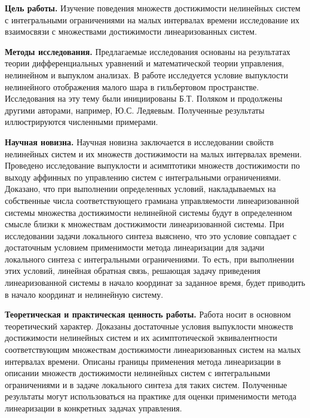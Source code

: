 \documentclass[../main.tex]{subfiles}
\begin{document}
\textbf{Цель работы.} Изучение поведения множеств достижимости нелинейных систем с интегральными ограничениями на малых интервалах времени исследование их взаимосвязи с множествами достижимости линеаризованных систем.
	
\textbf{Методы исследования.} Предлагаемые исследования основаны на результатах теории дифференциальных уравнений и математической теории управления, нелинейном и выпуклом анализах. В работе исследуется условие выпуклости нелинейного отображения малого шара в гильбертовом пространстве. Исследования на эту тему были инициированы Б.Т. Поляком\cite{Polyak2001} и продолжены другими авторами, например, Ю.С. Ледяевым\cite{Ledyaev}. Полученные результаты иллюстрируются численными примерами.
	
\textbf{Научная новизна.} Научная новизна заключается в исследовании свойств нелинейных систем и их множеств достижимости на малых интервалах времени. Проведено исследование выпуклости и асимптотики множеств достижимости по выходу аффинных по управлению систем с интегральными ограничениями. Доказано, что при выполнении определенных условий, накладываемых на собственные числа соответствующего грамиана управляемости линеаризованной системы множества достижимости нелинейной системы будут в определенном смысле близки к множествам достижимости линеаризованной системы. При исследовании задачи локального синтеза выяснено, что это условие совпадает с достаточным условием применимости метода линеаризации для задачи локального синтеза с интегральными ограничениями. То есть, при выполнении этих условий, линейная обратная связь, решающая задачу приведения линеаризованной системы в начало координат за заданное время, будет приводить в начало координат и нелинейную систему.

\textbf{Теоретическая и практическая ценность работы.} Работа носит в основном теоретический характер. Доказаны достаточные условия выпуклости множеств достижимости нелинейных систем и их асимптотической эквивалентности соответствующим множествам достижимости линеаризованных систем на малых интервалах времени. Описаны границы применения метода линеаризации в описании множеств достижимости нелинейных систем с интегральными ограничениями и в задаче локального синтеза для таких систем. Полученные результаты могут использоваться на практике для оценки применимости метода линеаризации в конкретных задачах управления.
	
\end{document}
